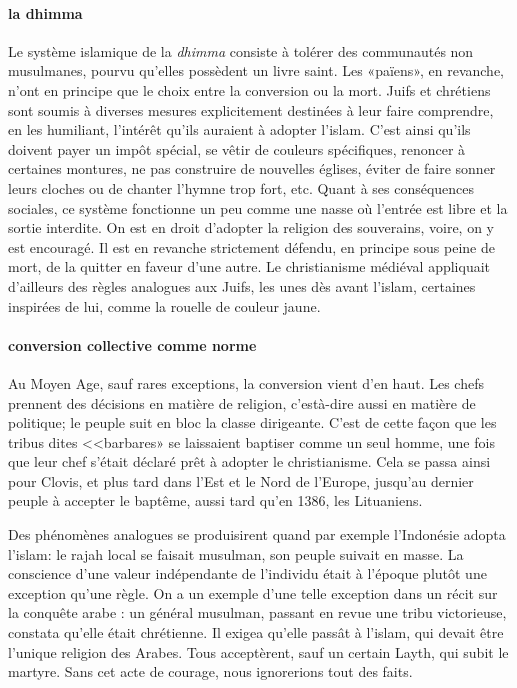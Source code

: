 \paragraph{la dhimma}
Le système islamique de la \textit{dhimma}  consiste à tolérer des communautés non musulmanes, pourvu qu'elles possèdent un livre saint. Les «païens», en revanche, n'ont en principe que le choix entre la conversion ou la mort. Juifs et chrétiens sont soumis à diverses mesures explicitement destinées à leur faire comprendre, en les humiliant, l'intérêt qu'ils auraient à adopter l'islam. C'est ainsi qu'ils doivent payer un impôt spécial, se vêtir de couleurs spécifiques, renoncer à certaines montures, ne pas construire de nouvelles églises, éviter de faire sonner leurs cloches ou de chanter l'hymne trop fort, etc. Quant à ses conséquences sociales, ce système fonctionne un peu comme une nasse où l'entrée est libre et la sortie interdite. On est en droit d'adopter la religion des souverains, voire, on y est encouragé. Il est en revanche strictement défendu, en principe sous peine de mort, de la quitter en faveur d'une autre. Le christianisme médiéval appliquait d'ailleurs des règles analogues
aux Juifs, les unes dès avant l'islam, certaines inspirées de lui, comme la rouelle de couleur jaune.

\paragraph{conversion collective comme norme}
Au Moyen Age, sauf rares exceptions, la conversion vient d'en haut. Les chefs prennent des décisions en matière de religion, c'està-dire aussi en matière de politique; le peuple suit en bloc la classe dirigeante. C'est de cette façon que les tribus dites <<barbares» se laissaient baptiser comme un seul homme, une fois que leur chef s'était déclaré prêt à adopter le christianisme. Cela se passa ainsi pour Clovis, et plus tard dans l'Est et le Nord de l'Europe, jusqu'au dernier peuple à accepter le baptême, aussi tard qu'en 1386, les Lituaniens.


Des phénomènes analogues se produisirent quand par exemple l'Indonésie adopta l'islam: le rajah local se faisait musulman, son peuple suivait en masse. La conscience d'une valeur indépendante de l'individu était à l'époque plutôt une exception qu'une règle. On a un exemple d'une telle exception dans un récit sur la conquête arabe : un général musulman, passant en revue une tribu victorieuse, constata qu'elle était chrétienne. Il exigea qu'elle passât à l'islam, qui devait être l'unique religion des Arabes. Tous acceptèrent, sauf un certain Layth, qui subit le martyre. Sans cet acte de courage, nous ignorerions tout des faits.


